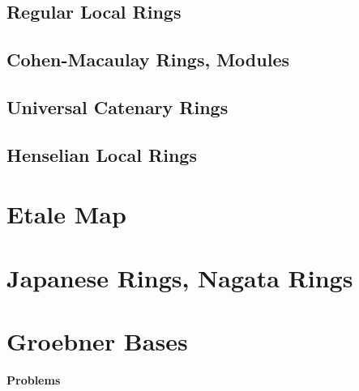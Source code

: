 \documentclass[Total.tex]{subfiles}
\begin{document}
		\section{Regular Local Rings}
		
		\section{Cohen-Macaulay Rings, Modules}
		
		\section{Universal Catenary Rings}
		
		\section{Henselian Local Rings}
	\chapter{Etale Map}
	
	\chapter{Japanese Rings, Nagata Rings}
	
	
	
	\chapter{Groebner Bases}
	
		
			\textbf{Problems}
			
\end{document}

